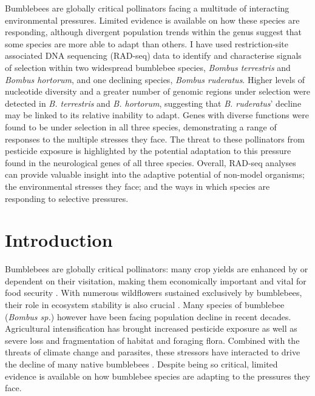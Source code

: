 \documentclass[12pt]{article}
\begin{document}
    
    \begin{linenumbers} 
    \restoregeometry
    
    
    \abstract
    

    Bumblebees are globally critical pollinators facing a multitude of interacting environmental pressures. Limited evidence is available on how these species are responding, although divergent population trends within the genus suggest that some species are more able to adapt than others. I have used restriction-site associated DNA sequencing (RAD-seq) data to identify and characterise signals of selection within two widespread bumblebee species, \emph{Bombus terrestris} and \emph{Bombus hortorum}, and one declining species, \emph{Bombus ruderatus}. Higher levels of nucleotide diversity and a greater number of genomic regions under selection were detected in \emph{B. terrestris} and \emph{B. hortorum}, suggesting that \emph{B. ruderatus}' decline may be linked to its relative inability to adapt. Genes with diverse functions were found to be under selection in all three species, demonstrating a range of responses to the multiple stresses they face.
    The threat to these pollinators from pesticide exposure is highlighted by the potential adaptation to this pressure found in the neurological genes of all three species.
    Overall, RAD-seq analyses can provide valuable insight into the adaptive potential of non-model organisms; the environmental stresses they face; and the ways in which species are responding to selective pressures.

    \newpage

    \section{Introduction}
    


	Bumblebees are globally critical pollinators: many crop yields are enhanced by or dependent on their visitation, making them economically important and vital for food security \citep{goulson_conserving_2003, sun_genus-wide_2021}. With numerous wildflowers sustained exclusively by bumblebees, their role in ecosystem stability is also crucial \citep{goulson_decline_2008, cameron_global_2020}. Many species of bumblebee (\emph{Bombus sp.}) however have been facing population decline in recent decades. Agricultural intensification has brought increased pesticide exposure as well as severe loss and fragmentation of habitat and foraging flora. Combined with the threats of climate change and parasites, these stressors have interacted to drive the decline of many native bumblebees \citep{carvell_declines_2006, oliver_interactions_2014, soroye_climate_2020, outhwaite_agriculture_2022}. Despite being so critical, limited evidence is available on how bumblebee species are adapting to the pressures they face.
	

\end{linenumbers}
\end{document}
